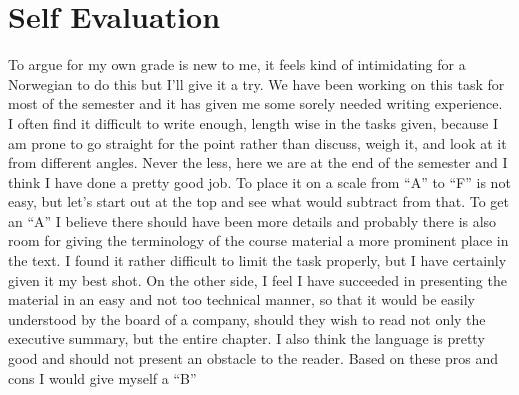 \section*{Self Evaluation}
To argue for my own grade is new to me, it feels kind of intimidating for a Norwegian to do this but I’ll give it a try.
We have been working on this task for most of the semester and it has given me some sorely needed writing experience. I often find it difficult to write enough, length wise in the tasks given, because I am prone to go straight for the point rather than discuss, weigh it, and look at it from different angles.
Never the less, here we are at the end of the semester and I think I have done a pretty good job. To place it on a scale from “A” to “F” is not easy, but let’s start out at the top and see what would subtract from that.
To get an “A” I believe there should have been more details and probably there is also room for giving the terminology of the course material a more prominent place in the text. I found it rather difficult to limit the task properly, but I have certainly given it my best shot. 
On the other side, I feel I have succeeded in presenting the material in an easy and not too technical manner, so that it would be easily understood by the board of a company, should they wish to read not only the executive summary, but the entire chapter. I also think the language is pretty good and should not present an obstacle to the reader.
Based on these pros and cons I would give myself a “B”
